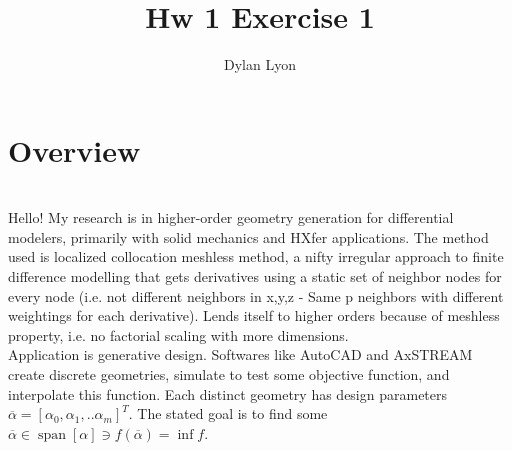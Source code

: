 \documentclass{article}
\title{\Huge Hw 1 Exercise 1}
\author{\huge Dylan Lyon}
\DeclareMathOperator{\spn}{span}
\begin{document}
\maketitle

\section{Overview}\\

Hello! My research is in higher-order geometry generation for differential modelers, primarily with solid mechanics and HXfer applications. The method used is localized collocation meshless method, a nifty irregular approach to finite difference modelling that gets derivatives using a static set of neighbor nodes for every node (i.e. not different neighbors in x,y,z - Same p neighbors with different weightings for each derivative). Lends itself to higher orders because of meshless property, i.e. no factorial scaling with more dimensions.\\

Application is generative design. Softwares like AutoCAD and AxSTREAM create discrete geometries, simulate to test some objective function, and interpolate this function. Each distinct geometry has design parameters $\overline{\alpha} = \left[ \alpha_0 , \alpha_1 , .. \alpha_m \right]^T$. The stated goal is to find some $\overline{\alpha} \in \spn \left[\alpha \right] \ni f(\overline{\alpha}) = \inf f$.\\
\end{document}
